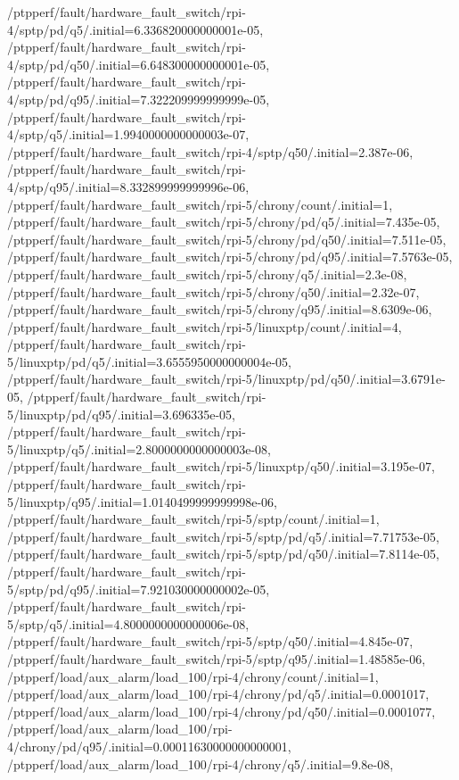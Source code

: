 {    /ptpperf/fault/hardware_fault_switch/rpi-4/sptp/pd/q5/.initial=6.336820000000001e-05,
    /ptpperf/fault/hardware_fault_switch/rpi-4/sptp/pd/q50/.initial=6.648300000000001e-05,
    /ptpperf/fault/hardware_fault_switch/rpi-4/sptp/pd/q95/.initial=7.322209999999999e-05,
    /ptpperf/fault/hardware_fault_switch/rpi-4/sptp/q5/.initial=1.9940000000000003e-07,
    /ptpperf/fault/hardware_fault_switch/rpi-4/sptp/q50/.initial=2.387e-06,
    /ptpperf/fault/hardware_fault_switch/rpi-4/sptp/q95/.initial=8.332899999999996e-06,
    /ptpperf/fault/hardware_fault_switch/rpi-5/chrony/count/.initial=1,
    /ptpperf/fault/hardware_fault_switch/rpi-5/chrony/pd/q5/.initial=7.435e-05,
    /ptpperf/fault/hardware_fault_switch/rpi-5/chrony/pd/q50/.initial=7.511e-05,
    /ptpperf/fault/hardware_fault_switch/rpi-5/chrony/pd/q95/.initial=7.5763e-05,
    /ptpperf/fault/hardware_fault_switch/rpi-5/chrony/q5/.initial=2.3e-08,
    /ptpperf/fault/hardware_fault_switch/rpi-5/chrony/q50/.initial=2.32e-07,
    /ptpperf/fault/hardware_fault_switch/rpi-5/chrony/q95/.initial=8.6309e-06,
    /ptpperf/fault/hardware_fault_switch/rpi-5/linuxptp/count/.initial=4,
    /ptpperf/fault/hardware_fault_switch/rpi-5/linuxptp/pd/q5/.initial=3.6555950000000004e-05,
    /ptpperf/fault/hardware_fault_switch/rpi-5/linuxptp/pd/q50/.initial=3.6791e-05,
    /ptpperf/fault/hardware_fault_switch/rpi-5/linuxptp/pd/q95/.initial=3.696335e-05,
    /ptpperf/fault/hardware_fault_switch/rpi-5/linuxptp/q5/.initial=2.8000000000000003e-08,
    /ptpperf/fault/hardware_fault_switch/rpi-5/linuxptp/q50/.initial=3.195e-07,
    /ptpperf/fault/hardware_fault_switch/rpi-5/linuxptp/q95/.initial=1.0140499999999998e-06,
    /ptpperf/fault/hardware_fault_switch/rpi-5/sptp/count/.initial=1,
    /ptpperf/fault/hardware_fault_switch/rpi-5/sptp/pd/q5/.initial=7.71753e-05,
    /ptpperf/fault/hardware_fault_switch/rpi-5/sptp/pd/q50/.initial=7.8114e-05,
    /ptpperf/fault/hardware_fault_switch/rpi-5/sptp/pd/q95/.initial=7.921030000000002e-05,
    /ptpperf/fault/hardware_fault_switch/rpi-5/sptp/q5/.initial=4.8000000000000006e-08,
    /ptpperf/fault/hardware_fault_switch/rpi-5/sptp/q50/.initial=4.845e-07,
    /ptpperf/fault/hardware_fault_switch/rpi-5/sptp/q95/.initial=1.48585e-06,
    /ptpperf/load/aux_alarm/load_100/rpi-4/chrony/count/.initial=1,
    /ptpperf/load/aux_alarm/load_100/rpi-4/chrony/pd/q5/.initial=0.0001017,
    /ptpperf/load/aux_alarm/load_100/rpi-4/chrony/pd/q50/.initial=0.0001077,
    /ptpperf/load/aux_alarm/load_100/rpi-4/chrony/pd/q95/.initial=0.00011630000000000001,
    /ptpperf/load/aux_alarm/load_100/rpi-4/chrony/q5/.initial=9.8e-08,
}
